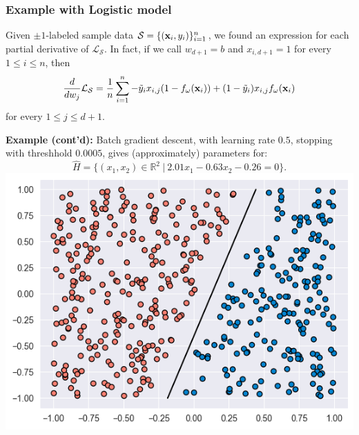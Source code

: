 \documentclass{beamer}
\theoremstyle{example}
\begin{document}
\begin{frame}
    \frametitle{Example with Logistic model}
    Given $\pm1$-labeled sample data $\mathcal S= \{({\bf x}_i, y_i)\}_{i=1}^n$, we found an expression for each partial derivative of $\mathcal L_{\mathcal S}$. In fact, if we call $w_{d+1} = b$ and $x_{i,d+1} = 1$ for every $1\le i\le n$, then 
        {\small 
        \[\frac{d}{dw_{j}}\mathcal L_{\mathcal S} = \frac1n\sum_{i=1}^n-\tilde y_ix_{i,j}(1-f_{\omega}({\bf x}_i)) + (1-\tilde y_i)x_{i,j}f_{\omega}({\bf x}_i)\]
        }
    for every $1\le j\le d+1$.

    \textbf{Example (cont'd):} Batch gradient descent, with learning rate $0.5$, stopping with threshhold $0.0005$, gives (approximately) parameters for: 
        \[\hat{H} = \{(x_1,x_2)\in\mathbb R^2\ |\ 2.01x_1 - 0.63x_2-0.26=0\}.\]
    \centering
    \includegraphics[height=0.3\textheight]{../../Images/Hfit-simulated-logregression-data.png}
\end{frame}
\end{document}
